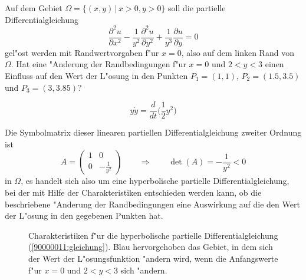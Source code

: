 Auf dem Gebiet $\Omega=\{(x,y)\,|\, x>0, y>0\}$ soll die partielle
Differentialgleichung
\begin{equation}
\frac{\partial^2 u}{\partial x^2}-\frac1{y^2}\frac{\partial^2 u}{\partial y^2} 
+
\frac1{y^3}\frac{\partial u}{\partial y}=0
\label{90000011:gleichung}
\end{equation}
gel"ost werden mit Randwertvorgaben f"ur $x=0$, also auf dem linken Rand von
$\Omega$.
Hat eine "Anderung der Randbedingungen f"ur $x=0$ und $2 < y<3$ einen
Einfluss auf den Wert der L"osung in den Punkten
$P_1=(1,1)$,
$P_2=(1.5,3.5)$ und
$P_3=(3,3.85)$?

\begin{hinweis}
\[
y\dot y=\frac{d}{dt}\bigl(
{\textstyle \frac12}y^2
\bigr)
\]
\end{hinweis}

\begin{loesung}
Die Symbolmatrix dieser linearen partiellen Differentialgleichung zweiter
Ordnung ist
\[
A=\begin{pmatrix}
1&0\\
0&-\frac1{y^2}
\end{pmatrix}
\qquad
\Rightarrow
\qquad
\det(A)=-\frac1{y^2}<0
\]
in $\Omega$, es handelt sich also um eine hyperbolische partielle
Differentialgleichung, bei der mit Hilfe der Charakteristiken entschieden
werden kann, ob die beschriebene "Anderung der Randbedingungen eine 
Auswirkung auf die den Wert der L"osung in den gegebenen Punkten hat.
\begin{figure}
\begin{center}
\end{center}
\caption{Charakteristiken f"ur die hyperbolische partielle
Differentialgleichung (\ref{90000011:gleichung}).
Blau hervorgehoben das Gebiet, in dem sich der Wert der L"osungsfunktion
"andern wird, wenn die Anfangswerte f"ur $x=0$ und $2<y<3$ sich "andern.
\label{90000011:bild}}
\end{figure}


\end{loesung}
